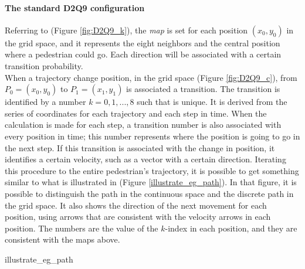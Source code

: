 \documentclass[class=article, crop=false]{standalone}
\begin{document}
	
\paragraph{The standard D2Q9 configuration}
Referring to (Figure \ref{fig:D2Q9_k}), the \emph{map} is set for each position $(x_0, y_0)$ in the grid space, and it represents the eight neighbors and the central position where a pedestrian could go. 
Each direction will be associated with a certain transition probability. 
\\When a trajectory change position, in the grid space (Figure \ref{fig:D2Q9_c}), from $P_0=(x_0, y_0)$ to $P_1=(x_1, y_1)$ is associated a transition. 
The transition is identified by a number $k = 0,1,...,8$ such that is unique. 
It is derived from the series of coordinates for each trajectory and each step in time. 
When the calculation is made for each step, a transition number is also associated with every position in time; this number represents where the position is going to go in the next step.
If this transition is associated with the change in position, it identifies a certain velocity, such as a vector with a certain direction. 
Iterating this procedure to the entire pedestrian’s trajectory, it is possible to get something similar to what is illustrated in (Figure \ref{illustrate_eg_path}). 
In that figure, it is possible to distinguish the path in the continuous space and the discrete path in the grid space. 
It also shows the direction of the next movement for each position, using arrows that are consistent with the velocity arrows in each position. 
The numbers are the value of the $k$-index in each position, and they are consistent with the maps above. 

	{illustrate_eg_path}
\end{document}
